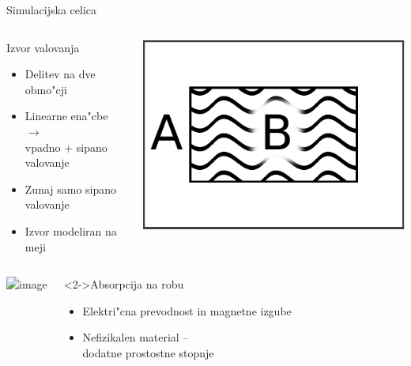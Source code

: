 \documentclass{beamer}
\begin{document}
\begin{frame}{Simulacijska celica}
\begin{columns}
 
 
 \begin{block}{Izvor valovanja}
 \begin{itemize}
  \item Delitev na dve obmo"cji
  \item Linearne ena"cbe $\rightarrow$ \\ vpadno + sipano valovanje
  \item Zunaj samo sipano valovanje
  \item Izvor modeliran na meji
 \end{itemize}
 \end{block}

 \begin{center}
 \includegraphics[width=.8\textwidth]{./Slike/wave-source-regions-one}
 \end{center}
 \end{columns}
 \begin{columns}


 \begin{center}
 \includegraphics<2->[width=.9\textwidth]{./Slike/celica}
 \end{center}


 \begin{block}<2->{Absorpcija na robu}
  \begin{itemize}
   \item Elektri"cna prevodnost in magnetne izgube
   \item Nefizikalen material -- \\ dodatne prostostne stopnje
  \end{itemize}
 \end{block}
 

\end{columns}
\end{frame}
\end{document}
